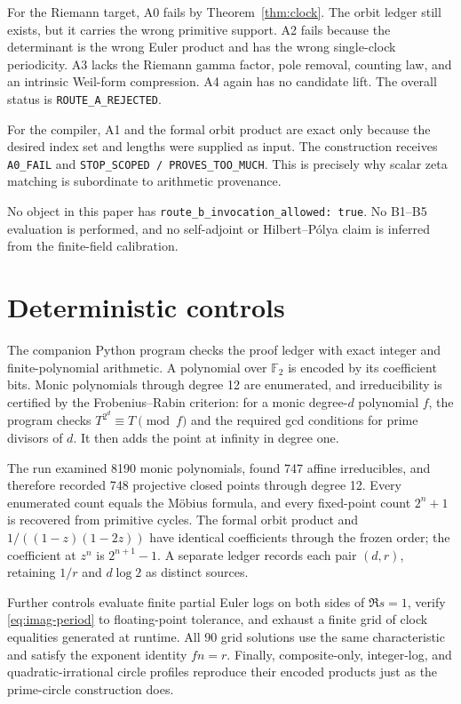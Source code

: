 \documentclass[11pt]{article}
\theoremstyle{definition}
\theoremstyle{remark}
\newcommand{\F}{\mathbb{F}}
\begin{document}
For the Riemann target, A0 fails by Theorem~\ref{thm:clock}.  The orbit ledger
still exists, but it carries the wrong primitive support.  A2 fails because
the determinant is the wrong Euler product and has the wrong single-clock
periodicity.  A3 lacks the Riemann gamma factor, pole removal, counting law,
and an intrinsic Weil-form compression.  A4 again has no candidate lift.
The overall status is \texttt{ROUTE\_A\_REJECTED}.

For the compiler, A1 and the formal orbit product are exact only because the
desired index set and lengths were supplied as input.  The construction
receives \texttt{A0\_FAIL} and
\texttt{STOP\_SCOPED / PROVES\_TOO\_MUCH}.  This is precisely why scalar zeta
matching is subordinate to arithmetic provenance.

No object in this paper has \texttt{route\_b\_invocation\_allowed: true}.
No B1--B5 evaluation is performed, and no self-adjoint or Hilbert--P\'olya
claim is inferred from the finite-field calibration.

\section{Deterministic controls}
\label{sec:controls}

The companion Python program checks the proof ledger with exact integer and
finite-polynomial arithmetic.  A polynomial over \(\F_2\) is encoded by its
coefficient bits.  Monic polynomials through degree 12 are enumerated, and
irreducibility is certified by the Frobenius--Rabin criterion: for a monic
degree-\(d\) polynomial \(f\), the program checks
\(T^{2^d}\equiv T\pmod f\) and the required gcd conditions for prime divisors
of \(d\).  It then adds the point at infinity in degree one.

The run examined 8190 monic polynomials, found 747 affine irreducibles, and
therefore recorded 748 projective closed points through degree 12.  Every
enumerated count equals the M\"obius formula, and every fixed-point count
\(2^n+1\) is recovered from primitive cycles.  The formal orbit product and
\(1/((1-z)(1-2z))\) have identical coefficients through the frozen order;
the coefficient at \(z^n\) is \(2^{n+1}-1\).  A separate ledger records each
pair \((d,r)\), retaining \(1/r\) and \(d\log2\) as distinct sources.

Further controls evaluate finite partial Euler logs on both sides of
\(\Re s=1\), verify \eqref{eq:imag-period} to floating-point tolerance, and
exhaust a finite grid of clock equalities generated at runtime.  All 90 grid
solutions use the same characteristic and satisfy the exponent identity
\(fn=r\).  Finally, composite-only, integer-log, and
quadratic-irrational circle profiles reproduce their encoded products just as
the prime-circle construction does.
\end{document}
